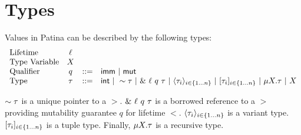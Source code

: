 \section*{Types}
Values in Patina can be described by the following types:
\[
\begin{array}{lccl}
\textrm{Lifetime} & \ell & & \\
\textrm{Type Variable} & X & & \\
\textrm{Qualifier} & q & ::= & \mathsf{imm} ~|~ \mathsf{mut} \\
\textrm{Type} & \tau & ::= & \mathsf{int} ~|~ \sim{\tau} ~|~ \&~{{\ell}~{q}~{\tau}} ~|~ 
				\langle{{\tau}_{i}}\rangle_{{i} \in \{1 \ldots {n}\} } ~|~ [{{\tau}_{i}}]_{{i} \in \{1 \ldots {n}\} } ~|~ 
				\mu {X}.{\tau} ~|~ X \\
\end{array}
\]

$\sim{\tau}$ is a unique pointer to a $\gt$.
$\&~{{\ell}~{q}~{\tau}}$ is a borrowed reference to a $\gt$
providing mutability guarantee $q$ for lifetime $\lt$.
$\langle{{\tau}_{i}}\rangle_{{i} \in \{1 \ldots {n}\} }$ is a variant type.
$[{{\tau}_{i}}]_{{i} \in \{1 \ldots {n}\} }$ is a tuple type.
Finally, $\mu {X}.{\tau}$ is a recursive type.
